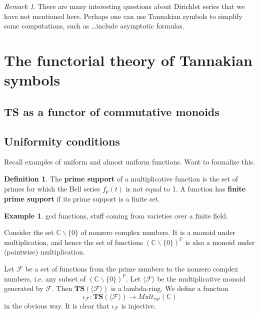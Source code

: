\documentclass[a4paper]{article}
\theoremstyle{definition}
\newtheorem{definition}{Definition}[section]
\newtheorem{example}{Example}[section]
\theoremstyle{remark}
\newtheorem*{remark}{Remark}
\newcommand{\C}{\mathbb{C}}
\newcommand{\TS}{\mathbf{TS}}
\newcommand{\defhl}[1]{\textbf{#1}}
\begin{document}
\begin{remark}
There are many interesting questions about Dirichlet series that we have not mentioned here. Perhaps one can use Tannakian symbols to simplify some computations, such as \ldots include asymptotic formulas.
\end{remark}


\section{The functorial theory of Tannakian symbols}


\subsection{\textbf{TS} as a functor of commutative monoids}

\subsection{Uniformity conditions}
Recall examples of uniform and almost uniform functions. Want to formalize this.

\begin{definition}
The \defhl{prime support} of a multiplicative function is the set of primes for which the Bell series $f_p(t)$ is not equal to 1. A function has \defhl{finite prime support} if its prime support is a finite set. 
\end{definition}

\begin{example}
gcd functions, stuff coming from varieties over a finite field.
\end{example}

Consider the set $\C \backslash \{ 0\}$ of nonzero complex numbers. It is a monoid under multiplication, and hence the set of functions $(\C \backslash \{ 0 \})^{\mathbb{P}}$ is also a monoid under (pointwise) multiplication.

Let $\mathcal{F}$ be a set of functions from the prime numbers to the nonzero complex numbers, i.e. any subset of $(\C \backslash \{ 0 \})^{\mathbb{P}}$. Let $\langle \mathcal{F} \rangle$ be the multiplicative monoid generated by $\mathcal{F}$. Then $\TS(\langle \mathcal{F} \rangle)$ is a lambda-ring. We define a function
$$ \iota_{\mathcal{F}} : \TS(\langle \mathcal{F} \rangle) \to Mult_{rat}(\C)  $$
in the obvious way. It is clear that $\iota_{\mathcal{F}}$ is injective.
\end{document}
